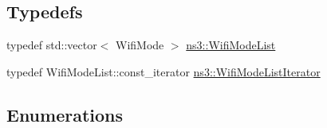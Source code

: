 \subsection*{Typedefs}
\begin{DoxyCompactItemize}
\item 
typedef std\+::vector$<$ Wifi\+Mode $>$ \hyperlink{namespacens3_abceecb3f813d2b4af697068f25085024}{ns3\+::\+Wifi\+Mode\+List}
\item 
typedef Wifi\+Mode\+List\+::const\+\_\+iterator \hyperlink{namespacens3_a652d37bfd751d39eea327ca3402f6196}{ns3\+::\+Wifi\+Mode\+List\+Iterator}
\end{DoxyCompactItemize}
\subsection*{Enumerations}
